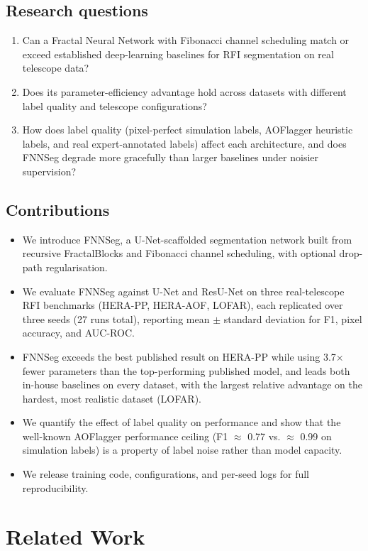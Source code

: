 \documentclass[11pt]{article}
\begin{document}
\subsection{Research questions}
\begin{enumerate}
\item Can a Fractal Neural Network with Fibonacci channel scheduling match or exceed established deep-learning baselines for RFI segmentation on real telescope data?
\item Does its parameter-efficiency advantage hold across datasets with different label quality and telescope configurations?
\item How does label quality (pixel-perfect simulation labels, AOFlagger heuristic labels, and real expert-annotated labels) affect each architecture, and does FNNSeg degrade more gracefully than larger baselines under noisier supervision?
\end{enumerate}

\subsection{Contributions}
\begin{itemize}
\item We introduce FNNSeg, a U-Net-scaffolded segmentation network built from recursive FractalBlocks and Fibonacci channel scheduling, with optional drop-path regularisation.
\item We evaluate FNNSeg against U-Net and ResU-Net on three real-telescope RFI benchmarks (HERA-PP, HERA-AOF, LOFAR), each replicated over three seeds (27 runs total), reporting mean $\pm$ standard deviation for F1, pixel accuracy, and AUC-ROC.
\item FNNSeg exceeds the best published result on HERA-PP \citep{dutoit2023} while using 3.7$\times$ fewer parameters than the top-performing published model, and leads both in-house baselines on every dataset, with the largest relative advantage on the hardest, most realistic dataset (LOFAR).
\item We quantify the effect of label quality on performance and show that the well-known AOFlagger performance ceiling (F1 $\approx$ 0.77 vs. $\approx$ 0.99 on simulation labels) is a property of label noise rather than model capacity.
\item We release training code, configurations, and per-seed logs for full reproducibility.
\end{itemize}

\section{Related Work}
\end{document}
